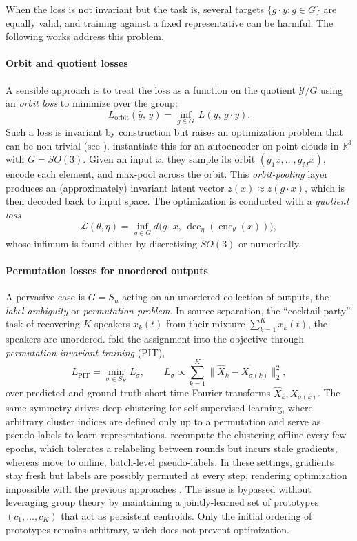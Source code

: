 \documentclass[mathematics,review,submit,moreauthors]{Definitions/mdpi}
\begin{document}
When the loss is not invariant but the task is, several targets $\{g\cdot y:g\in G\}$ are equally valid, and training against a fixed representative can be harmful.
The following works address this problem.

\paragraph{Orbit and quotient losses}
A sensible approach is to treat the loss as a function on the quotient $\mathcal{Y}/G$ using an \emph{orbit loss} to minimize over the group:
$$
L_{\mathrm{orbit}}(\hat y,\, y) = \inf_{g\in G}\, L(\hat y,\, g\cdot y).
$$
Such a loss is invariant by construction but raises an optimization problem that can be non-trivial (see ).
\citet{mehr20182iccvpr} instantiate this for an autoencoder on point clouds in $\mathbb{R}^3$ with $G=SO(3)$.
Given an input $x$, they sample its orbit $(g_1 x,\dots,g_M x)$, encode each element, and max-pool across the orbit.
This \emph{orbit-pooling} layer produces an (approximately) invariant latent vector $z(x)\approx z(g\cdot x)$, which is then decoded back to input space.
The optimization is conducted with a \emph{quotient loss} $$\mathcal{L}(\theta, \eta)=\inf_{g\in G} d\big(g\cdot x,\,\operatorname{dec}_\eta(\operatorname{enc}_\theta(x))\big),$$ whose infimum is found either by discretizing $SO(3)$ or numerically.

\paragraph{Permutation losses for unordered outputs}
A pervasive case is $G=S_n$ acting on an unordered collection of outputs, the \emph{label-ambiguity} or \emph{permutation problem}.
In source separation, the ``cocktail-party'' task of recovering $K$ speakers $x_k(t)$ from their mixture $\sum_{k=1}^K x_k(t)$, the speakers are unordered.
\citet{yu20172iicasspi} fold the assignment into the objective through \emph{permutation-invariant training} (PIT),
$$
L_{\mathrm{PIT}} = \min_{\sigma\in S_K} L_\sigma, \qquad L_\sigma \propto \sum_{k=1}^K \big\|\hat X_k - X_{\sigma(k)}\big\|_2^2,
$$
over predicted and ground-truth short-time Fourier transforms $\hat X_k, X_{\sigma(k)}$.
The same symmetry drives deep clustering for self-supervised learning, where arbitrary cluster indices are defined only up to a permutation and serve as pseudo-labels to learn representations.
\citet{caron2018,caron2019} recompute the clustering offline every few epochs, which tolerates a relabeling between rounds but incurs stale gradients, whereas \citet{caron2020anips} move to online, batch-level pseudo-labels.
In these settings, gradients stay fresh but labels are possibly permuted at every step, rendering optimization impossible with the previous approaches \citep{caron2018,caron2019}.
The issue is bypassed without leveraging group theory by maintaining a jointly-learned set of prototypes $(c_1,\dots,c_K)$ that act as persistent centroids.
Only the initial ordering of prototypes remains arbitrary, which does not prevent optimization.
\end{document}
